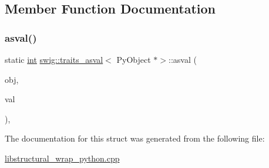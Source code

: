 \subsection{Member Function Documentation}
\mbox{\label{structswig_1_1traits__asval_3_01_py_object_01_5_4_aca155c255a1d5d8a00141cbc502f6197}} 
\subsubsection{\texorpdfstring{asval()}{asval()}}
{\footnotesize\ttfamily static \hyperlink{lp__lib_8h_adeb9ec6400320e4923ac9d836d509ddb}{int} \hyperlink{structswig_1_1traits__asval}{swig\+::traits\+\_\+asval}$<$ Py\+Object $\ast$$>$\+::asval (\begin{DoxyParamCaption}\item[{Py\+Object $\ast$}]{obj,  }\item[{\hyperlink{structswig_1_1traits__asval_3_01_py_object_01_5_4_a27a163991e96a33bcf1937a8ca435479}{value\+\_\+type} $\ast$}]{val }\end{DoxyParamCaption})\hspace{0.3cm}{\ttfamily [inline]}, {\ttfamily [static]}}



The documentation for this struct was generated from the following file\+:\begin{DoxyCompactItemize}
\item 
\hyperlink{libstructural__wrap__python_8cpp}{libstructural\+\_\+wrap\+\_\+python.\+cpp}\end{DoxyCompactItemize}
